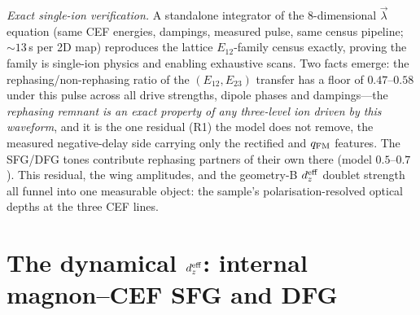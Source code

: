 \documentclass[11pt]{article}
\newcommand{\qfm}{q_{\rm FM}}
\begin{document}
\emph{Exact single-ion verification.}  A standalone integrator of the
8-dimensional $\vec\lambda$ equation (same CEF energies, dampings,
measured pulse, same census pipeline; $\sim13$\,s per 2D map)
reproduces the lattice $E_{12}$-family census exactly, proving the
family is single-ion physics and enabling exhaustive scans.  Two
facts emerge: the rephasing/non-rephasing ratio of the
$(E_{12},E_{23})$ transfer has a floor of $0.47$--$0.58$ under this
pulse across all drive strengths, dipole phases and dampings---the
\emph{rephasing remnant is an exact property of any three-level ion
driven by this waveform}, and it is the one residual (R1) the model
does not remove, the measured negative-delay side carrying only the
rectified and $\qfm$ features.  The SFG/DFG tones contribute
rephasing partners of their own there (model $0.5$--$0.7$).  This
residual, the wing amplitudes, and the geometry-B $d_z^{\rm eff}$
doublet strength all funnel into one measurable object: the sample's
polarisation-resolved optical depths at the three CEF lines.

\section{The dynamical $d_z^{\rm eff}$: internal magnon--CEF SFG and DFG}
\label{si:sfg}
\end{document}
